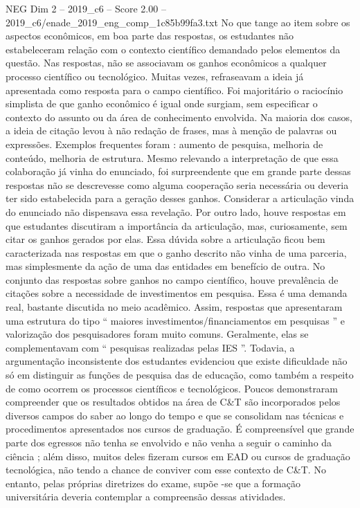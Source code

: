 \begin{textsample}{NEG Dim 2 – 2019\_c6 – Score 2.00 – 2019\_c6/enade\_2019\_eng\_comp\_1c85b99fa3.txt}
No que tange ao item sobre os aspectos econômicos, em boa parte das respostas, os estudantes não estabeleceram relação com o contexto científico demandado pelos elementos da questão.
Nas respostas, não se associavam os ganhos econômicos a qualquer processo científico ou tecnológico.
Muitas vezes, refraseavam a ideia já apresentada como resposta para o campo científico.
Foi majoritário o raciocínio simplista de que ganho econômico é igual onde surgiam, sem especificar o contexto do assunto ou da área de conhecimento envolvida.
Na maioria dos casos, a ideia de citação levou à não redação de frases, mas à menção de palavras ou expressões.
Exemplos frequentes foram : aumento de pesquisa, melhoria de conteúdo, melhoria de estrutura.
Mesmo relevando a interpretação de que essa colaboração já vinha do enunciado, foi surpreendente que em grande parte dessas respostas não se descrevesse como alguma cooperação seria necessária ou deveria ter sido estabelecida para a geração desses ganhos.
Considerar a articulação vinda do enunciado não dispensava essa revelação.
Por outro lado, houve respostas em que estudantes discutiram a importância da articulação, mas, curiosamente, sem citar os ganhos gerados por elas.
Essa dúvida sobre a articulação ficou bem caracterizada nas respostas em que o ganho descrito não vinha de uma parceria, mas simplesmente da ação de uma das entidades em benefício de outra.
No conjunto das respostas sobre ganhos no campo científico, houve prevalência de citações sobre a necessidade de investimentos em pesquisa.
Essa é uma demanda real, bastante discutida no meio acadêmico.
Assim, respostas que apresentaram uma estrutura do tipo “ maiores investimentos/financiamentos em pesquisas ” e valorização dos pesquisadores foram muito comuns.
Geralmente, elas se complementavam com “ pesquisas realizadas pelas IES ”.
Todavia, a argumentação inconsistente dos estudantes evidenciou que existe dificuldade não só em distinguir as funções de pesquisa das de educação, como também a respeito de como ocorrem os processos científicos e tecnológicos.
Poucos demonstraram compreender que os resultados obtidos na área de C\&T são incorporados pelos diversos campos do saber ao longo do tempo e que se consolidam nas técnicas e procedimentos apresentados nos cursos de graduação.
É compreensível que grande parte dos egressos não tenha se envolvido e não venha a seguir o caminho da ciência ; além disso, muitos deles fizeram cursos em EAD ou cursos de graduação tecnológica, não tendo a chance de conviver com esse contexto de C\&T.
No entanto, pelas próprias diretrizes do exame, supõe -se que a formação universitária deveria contemplar a compreensão dessas atividades.

\end{textsample}
